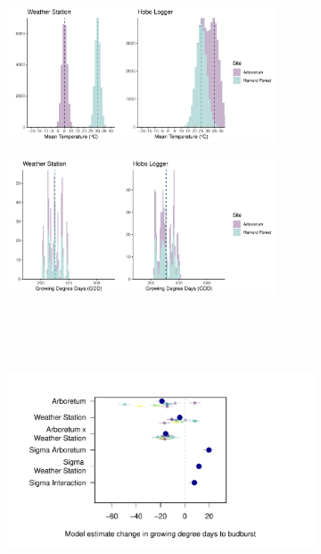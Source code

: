 \documentclass{article}\usepackage[]{graphicx}\usepackage[]{color}
\begin{document}
\begin{figure}
  \begin{subfigure}{.5\linewidth}
    \caption{}
    \centering
    \includegraphics[height=4cm, width=8cm]{..//analyses/figures/clim_methods_urbanws.pdf}
    \label{fig:climurbanws}
  \end{subfigure}%
    \begin{subfigure}{.5\linewidth}
      \caption{}
      \centering
      \includegraphics[height=4cm, width=8cm]{..//analyses/figures/gdd_methods_urbanws.pdf}
    \label{fig:gddurbanws}
  \end{subfigure}\\[1ex]
  \begin{subfigure}{\linewidth}
	    \caption{}
      \centering
      \includegraphics[height=7cm, width=11cm]{..//analyses/figures/muplot_urbws.pdf}
      \label{fig:muploturbanws}
  \end{subfigure}

\end{figure}
\end{document}
